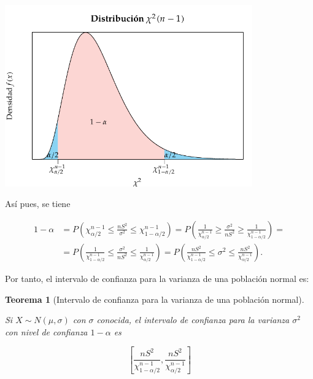 \documentclass[
  a4paper,
]{scrreport}
\theoremstyle{plain}
\newtheorem{theorem}{Teorema}[chapter]
\theoremstyle{definition}
\theoremstyle{definition}
\theoremstyle{remark}
\begin{document}
\begin{center}
\includegraphics[width=0.8\textwidth,height=\textheight]{img/estimacion/extremos-intervalo-varianza-normal.pdf}
\end{center}

Así pues, se tiene

\begin{align*}
1-\alpha &= P\left(\chi^{n-1}_{\alpha/2}\leq \frac{nS^2}{\sigma^2}  \leq \chi^{n-1}_{1-\alpha/2}\right) =
P\left(\frac{1}{\chi^{n-1}_{\alpha/2}}\geq \frac{\sigma^2}{nS^2}  \geq \frac{1}{\chi^{n-1}_{1-\alpha/2}}\right)=\\
&= P\left(\frac{1}{\chi^{n-1}_{1-\alpha/2}}\leq \frac{\sigma^2}{nS^2}  \leq \frac{1}{\chi^{n-1}_{\alpha/2}}\right)
= P\left(\frac{nS^2}{\chi^{n-1}_{1-\alpha/2}}\leq \sigma^2  \leq \frac{nS^2}{\chi^{n-1}_{\alpha/2}}\right).
\end{align*}

Por tanto, el intervalo de confianza para la varianza de una población
normal es:

\begin{theorem}[Intervalo de confianza para la varianza de una población
normal]\protect\hypertarget{thm-intervalo-confianza-varianza-normal}{}\label{thm-intervalo-confianza-varianza-normal}

Si \(X\sim N(\mu, \sigma)\) con \(\sigma\) conocida, el \emph{intervalo
de confianza para la varianza} \(\sigma^2\) con nivel de confianza
\(1-\alpha\) es

\[
\left[\frac{nS^2}{\chi^{n-1}_{1-\alpha/2}},\frac{nS^2}{\chi^{n-1}_{\alpha/2}}\right]
\]

\end{theorem}
\end{document}
